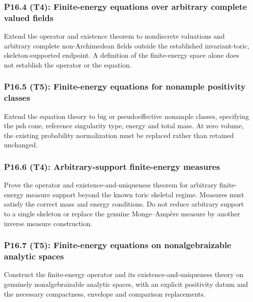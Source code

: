 \documentclass[11pt,a4paper]{article}
\theoremstyle{definition}
\theoremstyle{remark}
\begin{document}
\subsubsection*{P16.4 (T4): Finite-energy equations over arbitrary complete valued fields}
\label{atom:P16.4}
Extend the operator and existence theorem to nondiscrete valuations and arbitrary complete non-Archimedean fields outside the established invariant-toric, skeleton-supported endpoint. A definition of the finite-energy space alone does not establish the operator or the equation.

\subsubsection*{P16.5 (T5): Finite-energy equations for nonample positivity classes}
\label{atom:P16.5}
Extend the equation theory to big or pseudoeffective nonample classes, specifying the psh cone, reference singularity type, energy and total mass. At zero volume, the existing probability normalization must be replaced rather than retained unchanged.

\subsubsection*{P16.6 (T4): Arbitrary-support finite-energy measures}
\label{atom:P16.6}
Prove the operator and existence-and-uniqueness theorem for arbitrary finite-energy measure support beyond the known toric skeletal regime. Measures must satisfy the correct mass and energy conditions. Do not reduce arbitrary support to a single skeleton or replace the genuine Monge--Ampère measure by another inverse measure construction.

\subsubsection*{P16.7 (T5): Finite-energy equations on nonalgebraizable analytic spaces}
\label{atom:P16.7}
Construct the finite-energy operator and its existence-and-uniqueness theory on genuinely nonalgebraizable analytic spaces, with an explicit positivity datum and the necessary compactness, envelope and comparison replacements.
\end{document}
